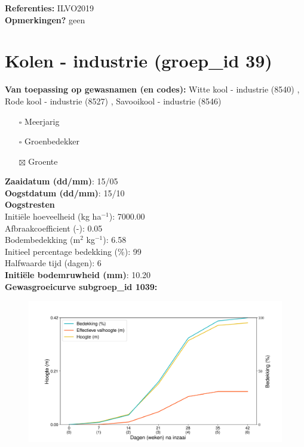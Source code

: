 \documentclass{article}
\begin{document}
  \textbf{Referenties:} ILVO2019 \vspace{0.10cm} \\ 
  \textbf{Opmerkingen?} geen \vspace{0.10cm} \\ 
 \newpage 
 \section{Kolen - industrie (groep\_id 39)} 
 \textbf{Van toepassing op gewasnamen (en codes):} Witte kool - industrie (8540) , Rode kool - industrie (8527) , Savooikool - industrie (8546) 
 \begin{multicols}{3} \begin{itemize} \item[$\square$] Meerjarig \item[$\square$] Groenbedekker \item[$\boxtimes$] Groente \end{itemize} \end{multicols} 
  \textbf{Zaaidatum (dd/mm)}: 15/05  \vspace{0.10cm} \\ 
  \textbf{Oogstdatum (dd/mm)}: 15/10  \vspace{0.10cm} \\ 
  \textbf{Oogstresten} \vspace{0.05cm} \\ 
  \tab Initi\"{e}le hoeveelheid (kg ha$^{-1}$): 7000.00 \vspace{0.05cm} \\ 
  \tab Afbraakcoefficient (-): 0.05 \vspace{0.05cm} \\ 
  \tab Bodembedekking (m$^2$ kg$^{-1}$): 6.58 \vspace{0.05cm} \\ 
  \tab Initieel percentage bedekking (\%): 99 \vspace{0.05cm} \\ 
  \tab Halfwaarde tijd (dagen): 6 \vspace{0.05cm} \\ 
  \textbf{Initi\"{e}le bodemruwheid (mm)}: 10.20 \vspace{0.05cm} \\ 
  \textbf{Gewasgroeicurve subgroep\_id 1039:} 
 \begin{center} \begin{figure}[H] \includegraphics[width=12.5cm]{temp/1039.png} \end{figure} \end{center} 
\end{document}
